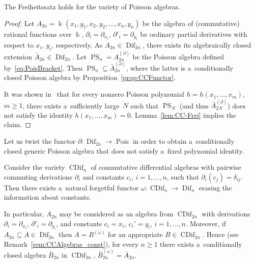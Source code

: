 \begin{corollary}
The Freiheitssatz holds for the variety of Poisson algebras.
\end{corollary}

\begin{proof}
Let $A_{2n} = \Bbbk(x_1,y_1, x_2,y_2, \dots,x_n, y_n)$ be the algebra of (commutative) rational functions over $\Bbbk$,
$\partial_i= \partial_{x_i}$, $\partial'_i=\partial_{y_i}$ be ordinary partial derivatives with respect to $x_i$, $y_i$,
respectively.
As $A_{2n}\in \operatorname{Dif}_{2n}$, there exists its algebraically closed extension $\bar A_{2n} \in \operatorname{Dif}_{2n}$.
Let $\operatorname{PS}_n = A_{2n}^{(\partial)}$ be the Poisson algebra def\/ined by~\eqref{eq:PoisBracket}.
Then $\operatorname{PS}_n \subseteq \bar A_{2n}^{(\partial)}$, where the latter is a~conditionally closed Poisson algebra by Proposition~\ref{prop:CCFunctor}.

It was shown in~\cite{FarkasI} that for every nonzero Poisson polynomial $h=h(x_1,\dots, x_m)$, $m\ge 1$, there exists
a~suf\/f\/iciently large~$N$ such that $\operatorname{PS}_N$ (and thus $\bar A_{2N}^{(\partial)}$) does not satisfy the identity
$h(x_1,\dots, x_m)=0$.
Lemma~\ref{lem:CC-Frei} implies the claim.
\end{proof}

Let us twist the functor $\partial: \operatorname{Dif}_{2n}\to \operatorname{Pois}$ in order to obtain a~conditionally closed generic Poisson algebra
that does not satisfy a~f\/ixed polynomial identity.

Consider the variety $\operatorname{CDif}_{n}$ of commutative dif\/ferential algebras with pairwise commuting derivations $\partial_i$
and constants $c_i$, $i=1,\dots, n$, such that $\partial_i(c_j)=\delta_{ij}$.
Then there exists a~natural forgetful functor $\omega: \operatorname{CDif}_n\to \operatorname{Dif}_n$ erasing the information about constants.

In particular, $A_{2n}$ may be considered as an algebra from $\operatorname{CDif}_{2n}$ with derivations $\partial_i=\partial_{x_i}$,
$\partial'_i=\partial_{y_i}$, and constants $c_i=x_i$, $c_i'=y_i$, $i=1,\dots, n$.
Moreover, if $A_{2n}\subseteq A\in \operatorname{Dif}_{2n}$ then $A=B^{(\omega)}$ for an appropriate $B\in \operatorname{CDif}_{2n}$.
Hence (see Remark~\ref{rem:CCAlgebras_const}), for every $n\ge 1$ there exists a~conditionally closed algebra $\bar
B_{2n}$ in $\operatorname{CDif}_{2n}$, $\bar B_{2n}^{(\omega)}=\bar A_{2n}$.

